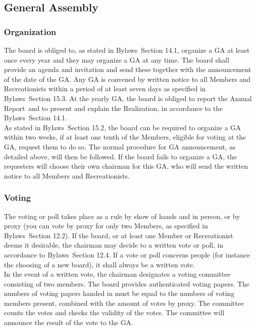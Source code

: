 \documentclass[a4paper]{article}
\newcommand{\Asta}{Bylaws} %
\newcommand{\Ajv}{Annual Report} %
\begin{document}
\subsection{General Assembly}
\subsubsection{Organization}
\label{section:yearlyGA}
The board is obliged to, as stated in \Asta\ Section 14.1, organize a GA at least once every year and they may organize a GA at any time. The board shall provide an agenda and invitation and send these together with the announcement of the date of the GA. Any GA is convened by written notice to all Members and Recreationists within a period of at least seven days as specified in \Asta\ Section 15.3. At the yearly GA, the board is obliged to report the \Ajv\ and to present and explain the Realization, in accordance to the \Asta\ Section 14.1. \\

As stated in \Asta\ Section 15.2, the board can be required to organize a GA within two weeks, if at least one tenth of the Members, eligible for voting at the GA, request them to do so. The normal procedure for GA announcement, as detailed above, will then be followed. If the board fails to organize a GA, the requesters will choose their own chairman for this GA, who will send the written notice to all Members and Recreationists. \\

\subsubsection{Voting}
The voting or poll takes place as a rule by show of hands and in person, or by proxy (you can vote by proxy for only two Members, as specified in \Asta\ Section 12.2). If the board, or at least one Member or Recreationist deems it desirable, the chairman may decide to a written vote or poll, in accordance to \Asta\ Section 12.4. If a vote or poll concerns people (for instance the choosing of a new board), it shall always be a written vote. \\ 

In the event of a written vote, the chairman designates a voting committee consisting of two members. The board provides authenticated voting papers. The numbers of voting papers handed in must be equal to the numbers of voting members present, combined with the amount of votes by proxy. The committee counts the votes and checks the validity of the votes. The committee will announce the result of the vote to the GA. \\
\end{document}
